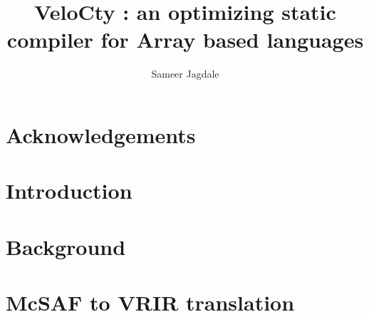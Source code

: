 \documentclass[MSc,twoside,openright]{Thesis}
\title{VeloCty : an optimizing static compiler for Array based languages }
\author{Sameer Jagdale}
\begin{document}
\pagestyle{empty}

\maketitle
\cleardoublepage


\preface %

\begin{Abstract}

\end{Abstract}

\begin{Resume}

\end{Resume}

\chapter*{Acknowledgements}



\renewcommand{\contentsname}{Table of Contents}%
\addto\captionsenglish{%
  \renewcommand{\contentsname}%
    {Table of Contents}%
}
\addto\captionsenglish{%
  \renewcommand{\lstlistlistingname}%
    {List of Listings}%
}

\tableofcontents
\listoffigures
\listoftables
\renewcommand{\lstlistlistingname}{List of Listings}
\lstlistoflistings 
\cleardoublepage

\maintext %

\pagestyle{fancyplain}

\chapter{Introduction} \label{chap:Introduction}

\chapter{Background} \label{chap:Background}

\chapter{McSAF to VRIR translation} \label{chap:McSAFTranslate}

\end{document}
